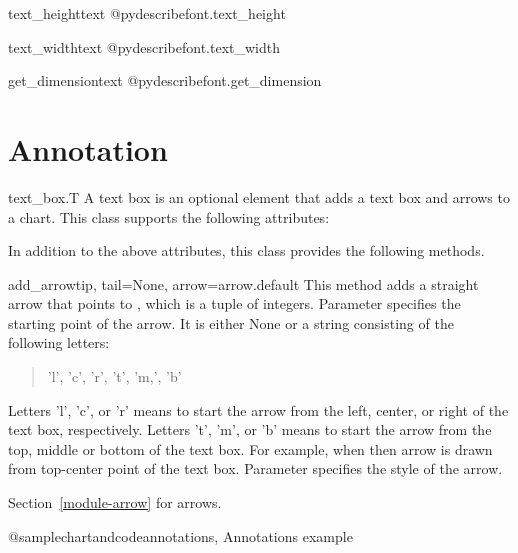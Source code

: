\documentclass{howto}
\begin{document}
\begin{funcdesc}{text_height}{text}
@pydescribe{font.text_height}
\end{funcdesc}

\begin{funcdesc}{text_width}{text}
@pydescribe{font.text_width}
\end{funcdesc}

\begin{funcdesc}{get_dimension}{text}
@pydescribe{font.get_dimension}
\end{funcdesc}

\section{Annotation}

\begin{classdesc*}{text_box.T}
A text box is an optional element that adds a text box and arrows to a
chart.  This class supports the following attributes:
\end{classdesc*}


In addition to the above attributes, this class
provides the following methods.

\begin{methoddesc}{add_arrow}{tip, tail=None, arrow=arrow.default}
This method adds a straight arrow that points to , which is
a tuple of integers. Parameter 
specifies the starting point of the
arrow. It is either None or a string consisting of the following
letters:
\begin{quote}
'l', 'c', 'r', 't', 'm,', 'b'
\end{quote}

Letters 'l', 'c', or 'r'
means to start the arrow from the left, center, or right of the text
box, respectively. Letters 't', 'm', or 'b' means to start the arrow
from the top, middle or bottom of the text box.  For example, when
 then arrow is drawn from top-center point of the text
box. Parameter  specifies the style of the arrow.

\begin{seealso}
Section~\ref{module-arrow} for arrows.
\end{seealso}
\end{methoddesc}

@samplechartandcode{annotations, Annotations example}
\end{document}
